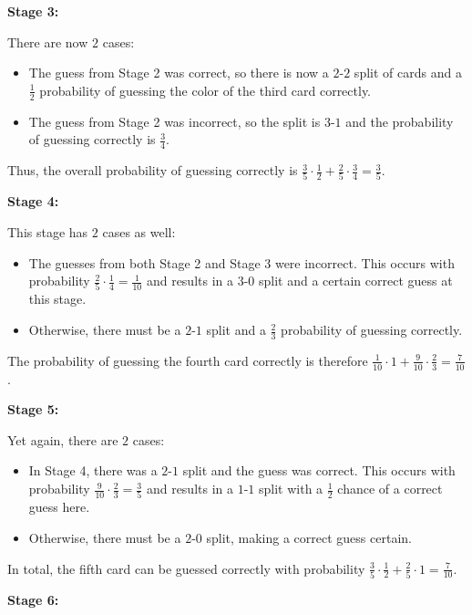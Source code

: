 \begin{enumerate}
{{ \textbf{Stage 3:}

 There are now $2$ cases:

 
            \begin{itemize}
        \item  The guess from Stage 2 was correct, so there is now a $2$-$2$ split of cards and a $\frac{1}{2}$ probability of guessing the color of the third card correctly.
        \item  The guess from Stage 2 was incorrect, so the split is $3$-$1$ and the probability of guessing correctly is $\frac{3}{4}$. 
            \end{itemize}
            Thus, the overall probability of guessing correctly is $\frac{3}{5} \cdot \frac{1}{2} + \frac{2}{5} \cdot \frac{3}{4} = \frac{3}{5}$.

 \textbf{Stage 4:}

 This stage has $2$ cases as well:

 
            \begin{itemize}
        \item  The guesses from both Stage 2 and Stage 3 were incorrect. This occurs with probability $\frac{2}{5} \cdot \frac{1}{4} = \frac{1}{10}$ and results in a $3$-$0$ split and a certain correct guess at this stage.
        \item  Otherwise, there must be a $2$-$1$ split and a $\frac{2}{3}$ probability of guessing correctly.
            \end{itemize}
            The probability of guessing the fourth card correctly is therefore $\frac{1}{10} \cdot 1 + \frac{9}{10} \cdot \frac{2}{3} = \frac{7}{10}$.

 \textbf{Stage 5:}

 Yet again, there are $2$ cases:

 
            \begin{itemize}
        \item  In Stage 4, there was a $2$-$1$ split and the guess was correct. This occurs with probability $\frac{9}{10} \cdot \frac{2}{3} = \frac{3}{5}$ and results in a $1$-$1$ split with a $\frac{1}{2}$ chance of a correct guess here.
        \item  Otherwise, there must be a $2$-$0$ split, making a correct guess certain.
            \end{itemize}
            In total, the fifth card can be guessed correctly with probability $\frac{3}{5} \cdot \frac{1}{2} + \frac{2}{5} \cdot 1 = \frac{7}{10}$.

 \textbf{Stage 6:}

}}
\end{enumerate}
